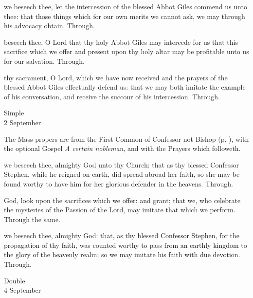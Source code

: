 \collect
{} we beseech thee, let the intercession of the blessed Abbot Giles commend us unto thee: that those things which for our own merits we cannot ask, we may through his advocacy obtain. Through.


\secret
{} beseech thee, O Lord that thy holy Abbot Giles may intercede for us that this sacrifice which we offer and present upon thy holy altar may be profitable unto us for our salvation. Through.

\postcommunion
{} thy sacrament, O Lord, which we have now received and the prayers of the blessed Abbot Giles effectually defend us: that we may both imitate the example of his conversation, and receive the succour of his intercession. Through.

\begin{inhead}
	{Simple\\
		2 September}
\end{inhead}

\begin{rubric}
	The Mass propers are from the First Common of Confessor not Bishop (p. \pageref{CommonConfessorNotBishopI}), with the optional Gospel \emph{A certain nobleman}, and with the Prayers which followeth.
\end{rubric}

\collect
{} we beseech thee, almighty God unto thy Church: that as thy blessed Confessor Stephen, while he reigned on earth, did spread abroad her faith, so she may be found worthy to have him for her glorious defender in the heavens. Through.

\secret
{} God, look upon the sacrifices which we offer: and grant; that we, who celebrate the mysteries of the Passion of the Lord, may imitate that which we perform. Through the same.

\postcommunion
{} we beseech thee, almighty God: that, as thy blessed Confessor Stephen, for the propagation of thy faith, was counted worthy to pass from an earthly kingdom to the glory of the heavenly realm; so we may imitate his faith with due devotion. Through.

\begin{inhead}
	{Double\\
		4 September}
\end{inhead}

